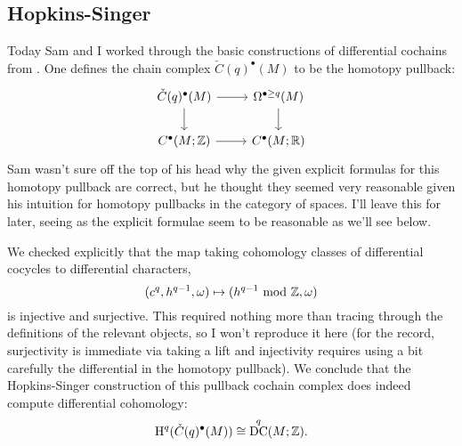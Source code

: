 \documentclass{amsart}
\DeclareMathOperator{\DC}{DC} %
\begin{document}
\subsection{Hopkins-Singer}
Today Sam and I worked through the basic constructions of differential cochains from
\cite{hopkins-singer}. One defines the chain complex $\check C(q)^\bullet(M)$ to be
the homotopy pullback:
\begin{equation*}
    \begin{tikzcd}
        \check C(q)^\bullet(M) \rar\dar & \Omega^{\bullet\geq q}(M)\dar \\
        C^\bullet(M;\Z) \rar & C^\bullet(M;\R)
    \end{tikzcd}
\end{equation*}
Sam wasn't sure off the top of his head why the given explicit formulas for this homotopy
pullback are correct, but he thought they seemed very reasonable given his intuition
for homotopy pullbacks in the category of spaces. I'll leave this for later, seeing
as the explicit formulae seem to be reasonable as we'll see below.

We checked explicitly that the map taking cohomology classes of differential cocycles to
differential characters,
\begin{equation*}
    (c^q, h^{q-1}, \omega) \mapsto (h^{q-1}\text{ mod }\mathbb{Z}, \omega)
\end{equation*}
is injective and surjective. This required nothing more than tracing through the
definitions of the relevant objects, so I won't reproduce it here (for the record,
surjectivity is immediate via taking a lift and injectivity requires using a bit
carefully the differential in the homotopy pullback). We conclude that the
Hopkins-Singer construction of this pullback cochain complex does indeed compute
differential cohomology:
\begin{equation*}
    \HH^q(\check C(q)^\bullet(M)) \cong \DC^q(M;\Z).
\end{equation*}
\end{document}
